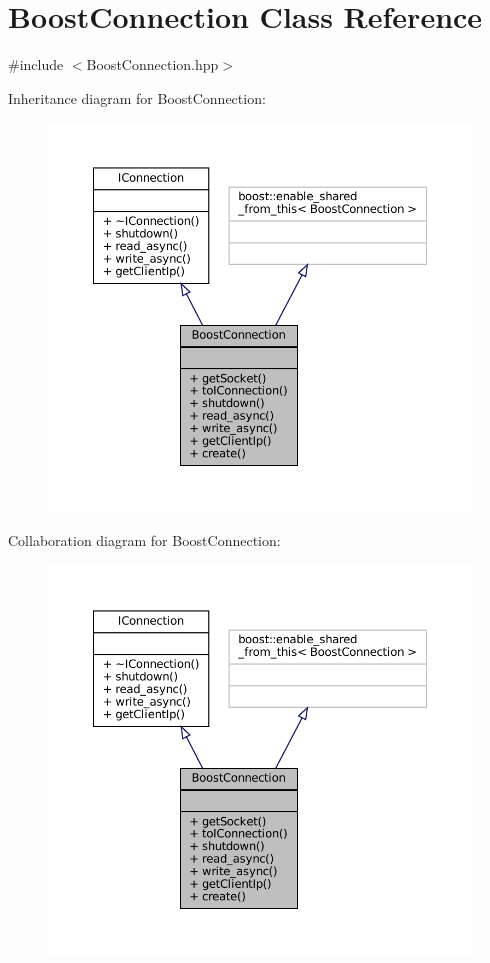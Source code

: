 \hypertarget{classBoostConnection}{}\section{Boost\+Connection Class Reference}
\label{classBoostConnection}


{\ttfamily \#include $<$Boost\+Connection.\+hpp$>$}



Inheritance diagram for Boost\+Connection\+:
\nopagebreak
\begin{figure}[H]
\begin{center}
\leavevmode
\includegraphics[width=350pt]{classBoostConnection__inherit__graph}
\end{center}
\end{figure}


Collaboration diagram for Boost\+Connection\+:
\nopagebreak
\begin{figure}[H]
\begin{center}
\leavevmode
\includegraphics[width=350pt]{classBoostConnection__coll__graph}
\end{center}
\end{figure}
